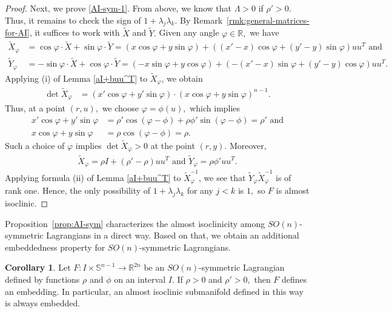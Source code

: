 \documentclass[11pt]{amsart}
\numberwithin{equation}{section}
\theoremstyle{definition}
\theoremstyle{definition}
\newtheorem{cor}[equation]{Corollary}
\newcommand{\pr}[1]{\left(#1\right)}
\newcommand{\bb}[1]{\mathbb{#1}} \newcommand{\td}[1]{\widetilde{#1}}
\begin{document}
\begin{proof}
	
	Next, we prove \eqref{AI-sym-1}.
	From above, we know that $\Lambda>0$ if $\rho'>0.$
	Thus, it remains to check the sign of $1+\lambda_j\lambda_k$.
    By Remark~\ref{rmk:general-matrices-for-AI}, it suffices to work with $\td X$ and $\td Y.$
	Given any angle $\varphi\in\bb R,$ we have
	\begin{align*}
	\td X_\varphi
	& = \cos\varphi \cdot \td X 
	+ \sin\varphi\cdot \td Y
	= \pr{x\cos\varphi + y\sin\varphi}
	+ ((x'-x)\cos\varphi+(y'-y)\sin\varphi)uu^T
	\text{ and}\\
	\td Y_\varphi
	& = -\sin\varphi\cdot \td X
	+ \cos\varphi\cdot \td Y
	= \pr{-x\sin\varphi + y\cos\varphi}
	+ (-(x'-x)\sin\varphi+(y'-y)\cos\varphi)uu^T.
	\end{align*}
	Applying (i) of Lemma \ref{aI+buu^T} to $\td X_\varphi$, we obtain
	\begin{align}\label{eq:detX}
	\det \td X_\varphi
	& =  \pr{x'\cos\varphi
		+ y'\sin\varphi}
	\cdot \pr{x\cos\varphi+y\sin\varphi}^{n-1}.
	\end{align}
	Thus, at a point $(r,u),$ we choose $\varphi=\phi(u),$ which implies
	\begin{align*}
	x'\cos\varphi + y'\sin\varphi
	& = \rho'\cos(\varphi-\phi)
	+ \rho\phi'\sin(\varphi-\phi)
	= \rho'
	\text{ and}\\
	x\cos\varphi + y\sin\varphi
	& = \rho\cos(\varphi-\phi)
	= \rho.
	\end{align*}
	Such a choice of $\varphi$ implies $\det \td X_\varphi>0$ at the point $(r,y).$
	Moreover,
	\begin{align*}
	\td X_\varphi
	= \rho I+(\rho' - \rho) uu^T
	\text{ and }
	\td Y_\varphi
	 = {\rho\phi'} uu^T.
	\end{align*}
	Applying formula (ii) of Lemma \ref{aI+buu^T} to $\td X_\varphi^{-1}$, we see that 
	$\td Y_\varphi \td X_\varphi^{-1}$ is of rank one.
	Hence, the only possibility of $1+\lambda_j\lambda_k$ for any $j<k$ is $1,$ so $F$ is almost isoclinic.
\end{proof}


Proposition~\ref{prop:AI-sym} characterizes the almost isoclinicity among ${SO}(n)$-symmetric Lagrangians in a direct way.
Based on that, we obtain an additional embeddedness property for ${SO}(n)$-symmetric Lagrangians.


\begin{cor}
	\label{cor:SOn-emb}
	Let $F\colon I\times \mathbb S^{n-1}\to\bb R^{2n}$ be an ${SO}(n)$-symmetric Lagrangian defined by functions $\rho$ and $\phi$ on an interval $I.$
	If $\rho>0$ and $\rho'>0,$ then $F$ defines an embedding.
	In particular, an almost isoclinic submanifold defined in this way is always embedded.
\end{cor}
\end{document}
